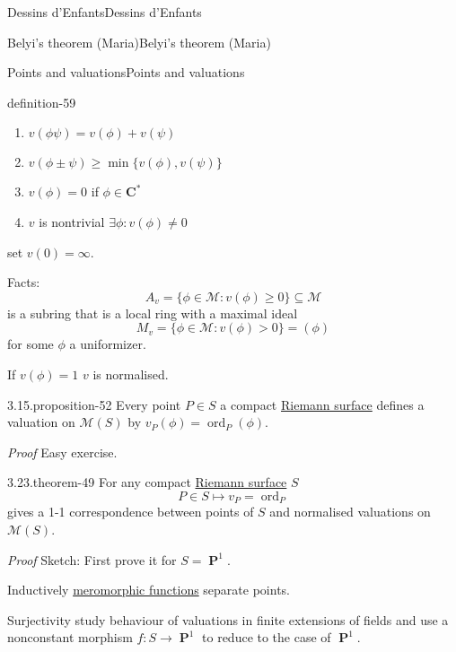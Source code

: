 \documentclass[10pt,]{book}
\makeatletter
\renewcommand*{\proofname}{Proof}
\renewenvironment{proof}[1][\proofname]{\par
  \pushQED{\qed}%
  \normalfont \topsep6\p@\@plus6\p@\relax
  \trivlist
  \item\relax
    {\itshape
    #1\@addpunct{.}}\hspace\labelsep\ignorespaces
}{%
  \popQED\endtrivlist\@endpefalse
}
\numberwithin{equation}{section}
\newcommand{\CC}{\mathbf{C}}
\DeclareMathOperator{\ord}{ord}
\DeclareMathOperator{\PP}{\mathbf{P}}
\newcommand{\gt}{>}
\makeatother
\begin{document}
\begin{chapterptx}{Dessins d'Enfants}{}{Dessins d'Enfants}{}{}
\begin{sectionptx}{Belyi's theorem (Maria)}{}{Belyi's theorem (Maria)}{}{}
\begin{subsectionptx}{Points and valuations}{}{Points and valuations}{}{}
\begin{definition}{}{definition-59}
\begin{enumerate}
\item\hypertarget{li-121}{}\(v(\phi\psi) = v(\phi)  + v(\psi)\)%
\item\hypertarget{li-122}{}\(v(\phi\pm\psi) \ge \min\{ v(\phi)  , v(\psi)\}\)%
\item\hypertarget{li-123}{}\(v(\phi) = 0 \) if \(\phi \in \CC^*\)%
\item\hypertarget{li-124}{}\(v\) is nontrivial \(\exists \phi : v(\phi)\ne 0\)%
\end{enumerate}
set \(v(0) = \infty\).%
\end{definition}
\hypertarget{p-616}{}%
Facts:%
\begin{equation*}
A_v = \{\phi \in \mathcal M : v(\phi) \ge 0 \} \subseteq \mathcal M
\end{equation*}
is a subring that is a local ring with a maximal ideal%
\begin{equation*}
M_v = \{ \phi\in \mathcal M : v(\phi) \gt 0\} = (\phi)
\end{equation*}
for some \(\phi\) a uniformizer.%
\par
\hypertarget{p-617}{}%
If \(v(\phi) = 1\) \(v\) is normalised.%
\begin{proposition}{3.15.}{}{proposition-52}%
\hypertarget{p-618}{}%
Every point \(P \in S\) a compact \hyperref[def-top-riem-surface]{Riemann surface} defines a valuation on \(\mathcal M(S)\) by \(v_P(\phi) = \ord_P(\phi)\).%
\end{proposition}
\begin{proof}\hypertarget{proof-92}{}
\hypertarget{p-619}{}%
Easy exercise.%
\end{proof}
\begin{theorem}{3.23.}{}{theorem-49}%
\hypertarget{p-620}{}%
For any compact \hyperref[def-top-riem-surface]{Riemann surface} \(S\)%
\begin{equation*}
P\in S \mapsto v_P = \ord_P
\end{equation*}
gives a 1-1 correspondence between points of \(S\) and normalised valuations on \(\mathcal M(S)\).%
\end{theorem}
\begin{proof}\hypertarget{proof-93}{}
\hypertarget{p-621}{}%
Sketch: First prove it for \(S = \PP^1\).%
\par
\hypertarget{p-622}{}%
Inductively \hyperref[def-morph-riem-surf]{meromorphic functions} separate points.%
\par
\hypertarget{p-623}{}%
Surjectivity study behaviour of valuations in finite extensions of fields and use a nonconstant morphism \(f\colon S \to \PP^1\) to reduce to the case of \(\PP^1\).%

\end{proof}
\end{subsectionptx}
\end{sectionptx}
\end{chapterptx}
\end{document}

